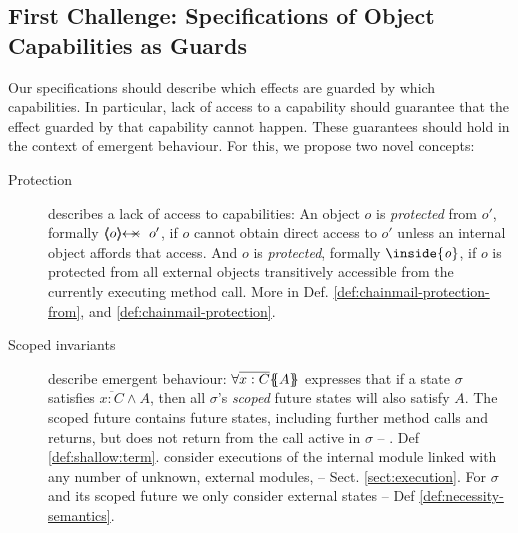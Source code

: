 



\subsection{First Challenge: Specifications of Object Capabilities as Guards}
\label{s:approach:necopers}


Our specifications should describe {which effects are guarded by which capabilities}. 
In particular, lack of access to {a capability  should} guarantee  that {the effect guarded by that capability cannot happen.}
  {These guarantees should hold  in the context of   emergent behaviour.}   
For this, we propose two %
{novel concepts}:

 
\begin{description}
\item[Protection] describes a lack of access to capabilities: An object $o$ is \emph{protected} from $o'$, formally $\protectedFrom {o} {o'}$,  if $o$ cannot obtain direct access to $o'$ unless an internal object affords that access. %
And $o$ is \emph{protected}, formally ${\inside{\prg{\it{o}}}}$, if $o$ is protected from all external objects transitively accessible from the currently executing method call. More in Def. \ref{def:chainmail-protection-from}, and \ref{def:chainmail-protection}.

\item[{Scoped invariants}] describe emergent behaviour:  {$\forall {\overline{x:C}}{{\{}\!\!{\{}}{A}{{\}}\!\!{\}}}$} expresses that if a 
{state} $\sigma$ 
  satisfies ${\overline{x:C}}  \wedge A$, then all $\sigma$'s \emph{scoped} future  states will  {also} satisfy  {$A$}. 
The scoped future contains future states, including further method calls and returns, but {does not return} from the call active in $\sigma$ --  \cf. Def  \ref{def:shallow:term}.
 consider executions of the internal module linked with any number of unknown, external modules,
-- \cf Sect. \ref{sect:execution}.
 For $\sigma$ and its scoped future   we only consider external states -- \cf Def \ref{def:necessity-semantics}.

\end{description}

